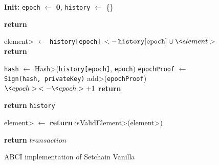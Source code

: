 \begin{figure}[t!]
  \begin{adjustbox}{minipage=[t]{\columnwidth}}
    \begin{algorithm}[H]
      \renewcommand{\thealgorithm}{Vanilla ABCI}         
      \caption{\small ABCI implementation of Setchain Vanilla}%
      \label{alg:abci-vanilla}%
      \small
      \begin{algorithmic}[1]
            \State \textbf{Init:} \texttt{epoch} $\leftarrow$ \textbf{0}, \texttt{history} $\leftarrow$ \{\}

            \label{alg:van_check_tx}
                \State \textbf{return} 
            \EndFunction
      
            \label{alg:van_deliver_tx}
                		\State \<element> $\leftarrow$ 
                		\State  \texttt{history[epoch]} \(<- \, \texttt{history}[\texttt{epoch}] \cup \<element>\)
                	\EndIf
                	\State \textbf{return}
            \EndFunction
            
            \label{alg:van_end_block}
            		\State \texttt{hash} $\leftarrow$ \<Hash>(\texttt{history[epoch]}, \texttt{epoch})
                \State \texttt{epochProof} $\leftarrow$  \texttt{Sign(\texttt{hash}, privateKey)}
                \State \<add>(\texttt{epochProof})
                \State \(\<epoch> \, <- \<epoch> + 1\)
                \State \textbf{return}
            \EndFunction
            
             \label{alg:van_query}
                \State \textbf{return} \texttt{history}
            \EndFunction
            
            \label{alg:van_is_valid_tx}
                \State \<element> $\leftarrow$ 
                \State \textbf{return} \<isValidElement>(\<element>)
            \EndFunction
            
            \label{alg:van_get_element}
                \State \textbf{return} $transaction$
            \EndFunction
        \end{algorithmic}
      \end{algorithm}
	\end{adjustbox}
  \end{figure}
